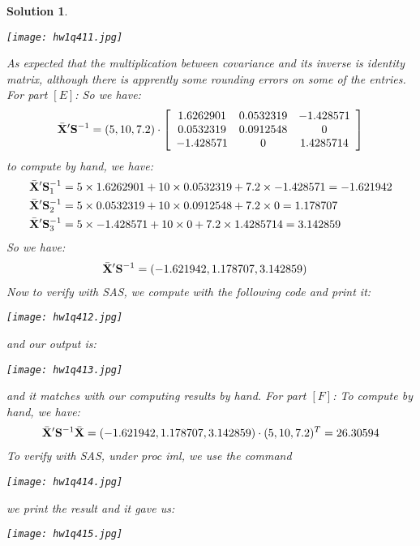 \documentclass[11pt]{article}\usepackage[]{graphicx}\usepackage[]{color}
\newtheorem{sol}{Solution}
\begin{document}
\begin{sol}
	\begin{center}
		\texttt{[image: hw1q411.jpg]}
	\end{center}
	As expected that the multiplication between covariance and its inverse is identity matrix, although there is apprently some rounding errors on some of the entries.\vskip 2mm
	For part $[E]$:\vskip 2mm
	So we have:
	\begin{align*}
		\bar{{\bf X}}'{\bf S}^{-1} = (5, 10, 7.2)\cdot \left[\begin{array}{ccc} 1.6262901&0.0532319&-1.428571 \\0.0532319 &0.0912548&0\\-1.428571 &0&1.4285714 \end{array}\right]
	\end{align*}
	to compute by hand, we have:
	\begin{align*}
		\bar{{\bf X}}'{\bf S}^{-1}_1 &= 5\times 1.6262901 + 10 \times 0.0532319 + 7.2 \times -1.428571 = -1.621942\\
		\bar{{\bf X}}'{\bf S}^{-1}_2 &= 5\times 0.0532319 + 10\times 0.0912548 + 7.2 \times 0 = 1.178707\\
		\bar{{\bf X}}'{\bf S}^{-1}_3 &= 5\times -1.428571 + 10\times 0 + 7.2 \times 1.4285714 = 3.142859
	\end{align*}
	So we have:
	\begin{align*}
	\bar{{\bf X}}'{\bf S}^{-1} &= (-1.621942,1.178707,3.142859)
	\end{align*}
	Now to verify with SAS, we compute with the following code and print it:
	\begin{center}
		\texttt{[image: hw1q412.jpg]}
	\end{center}
	and our output is:
	\begin{center}
	\texttt{[image: hw1q413.jpg]}
	\end{center}
	and it matches with our computing results by hand.\vskip 2mm
	For part $[F]$:\vskip 2mm
	To compute by hand, we have:
	\begin{align*}
		\bar{{\bf X}}'{\bf S}^{-1}\bar{{\bf X}} = (-1.621942,1.178707,3.142859)\cdot (5, 10, 7.2)^T = 26.30594
	\end{align*}
	To verify with SAS, under proc iml, we use the command
	\begin{center}
		\texttt{[image: hw1q414.jpg]}
	\end{center}
	we print the result and it gave us:
	\begin{center}
		\texttt{[image: hw1q415.jpg]}

\end{center}
\end{sol}
\end{document}
